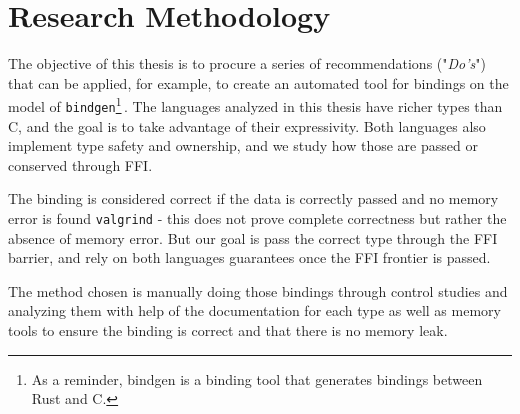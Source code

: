 \documentclass[nomenclature, english, bibtex]{kththesis}
\newcommand*{\generalExpl}[1]{\todo[inline]{#1}}
\newcommand*{\sweExpl}[1]{\todo[inline, backgroundcolor=kth-lightblue40]{#1}}  %
\begin{document}
\section{Research Methodology}
The objective of this thesis is to procure a series of recommendations ("\textit{Do's}") that can be applied, for example, to create an automated tool for bindings on the model of \texttt{bindgen}\footnote{As a reminder, bindgen is a binding tool that generates bindings between Rust and C.}\,\cite{noauthor_bindgen_2022}. The languages analyzed in this thesis have richer types than C, and the goal is to take advantage of their expressivity. Both languages also implement type safety and ownership, and we study how those are passed or conserved through FFI.

The binding is considered correct if the data is correctly passed and no memory error is found \texttt{valgrind} - this does not prove complete correctness but rather the absence of memory error. But our goal is pass the correct type through the FFI barrier, and rely on both languages guarantees once the FFI frontier is passed. 

The method chosen is manually doing those bindings through control studies and analyzing them with help of the documentation for each type as well as memory tools to ensure the binding is correct and that there is no memory leak. 
\end{document}
